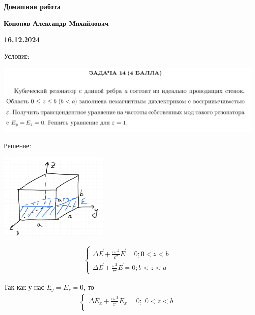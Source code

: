 \documentclass[12pt]{article}
\begin{document}
\begin{large}
\begin{center}
\LARGE \textbf{Домашняя работа}
\par
\LARGE \textbf{Кононов Александр Михайлович}
\par
    \textbf{16.12.2024}
\end{center}
\par Условие:
\par
\includegraphics[width=1\textwidth]{photo.png}
\par Решение:
\par
\par
\begin{center}
\includegraphics[width=0.4\textwidth]{photo_1.jpg}
\end{center}
\begin{eqnarray*}
    \begin{cases}
        \Delta \overrightarrow{E} + \frac{\varepsilon \omega^2}{c^2} \overrightarrow{E} = 0 ; 0 < z < b \\
        \Delta \overrightarrow{E} + \frac{\omega^2}{c^2} \overrightarrow{E} = 0 ; b < z < a
    \end{cases}
\end{eqnarray*}
\par Так как у нас $E_y = E_z = 0$, то
\begin{eqnarray*}
    \begin{cases}
        \Delta E_x + \frac{\varepsilon \omega^2}{c^2} E_x = 0 ; \,\, 0 < z < b \\

\end{cases}
\end{eqnarray*}
\end{large}
\end{document}
